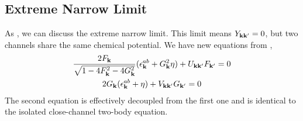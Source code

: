 \subsection{Extreme Narrow Limit}
As \cite{GurarieNarrow}, we can discuss the extreme narrow limit.  This limit means $Y_{\mathbf{k}\mathbf{k}'}=0$, but two channels share the same chemical potential.  We have new equations from ,
\begin{subequations}\label{eq:20100927:gapExtreme}
\begin{gather}\label{eq:20100927:gapa}
\frac{2F_{\mathbf{k}}}{\sqrt{1-4 F_{\mathbf{k}}^2-4 G_{\mathbf{k}}^2}} (\epsilon^{ab}_{\mathbf{k}}+  G_{\mathbf{k}}^2\eta)+U_{\mathbf{k}\mathbf{k}'}F_{\mathbf{k}'}=0\\
\label{eq:20100927:gapb}
{2G_{\ensuremath{\mathbf{k}}}}(\epsilon^{ab}_{\mathbf{k}}+\eta)+V_{\mathbf{k}\mathbf{k}'}G_{\mathbf{k}'}=0
\end{gather}
\end{subequations}
The second equation is effectively decoupled from the first one and is identical to the isolated close-channel two-body \sch equation. 